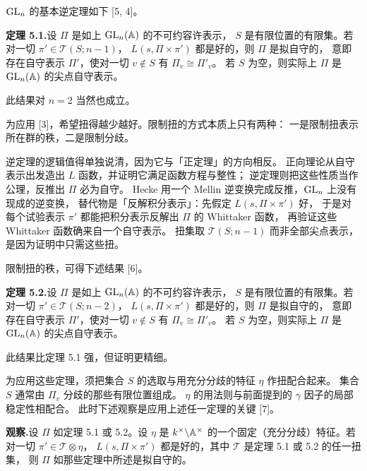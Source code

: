 $\mathrm{GL}_n$ 的基本逆定理如下 [5, 4]。

\textbf{定理 5.1.}\quad 设 $\Pi$ 是如上 $\mathrm{GL}_n(\mathbb{A})$ 的不可约容许表示，
$S$ 是有限位置的有限集。若对一切 $\pi'\in\mathcal{T}(S;n-1)$，
$L(s,\Pi\times\pi')$ 都是好的，则 $\Pi$ 是拟自守的，
意即存在自守表示 $\Pi'$，使对一切 $v\notin S$ 有 $\Pi_v\cong\Pi'_v$。
若 $S$ 为空，则实际上 $\Pi$ 是 $\mathrm{GL}_n(\mathbb{A})$ 的尖点自守表示。

此结果对 $n=2$ 当然也成立。

为应用 [3]，希望扭得越少越好。限制扭的方式本质上只有两种：
一是限制扭表示所在群的秩，二是限制分歧。
\begin{annote}
逆定理的逻辑值得单独说清，因为它与「正定理」的方向相反。
正向理论从自守表示出发造出 $L$ 函数，并证明它满足函数方程与整性；
逆定理则把这些性质当作公理，反推出 $\Pi$ 必为自守。
Hecke 用一个 Mellin 逆变换完成反推，$\mathrm{GL}_n$ 上没有现成的逆变换，
替代物是「反解积分表示」：先假定 $L(s,\Pi\times\pi')$ 好，
于是对每个试验表示 $\pi'$ 都能把积分表示反解出 $\Pi$ 的 Whittaker 函数，
再验证这些 Whittaker 函数确来自一个自守表示。
扭集取 $\mathcal{T}(S;n-1)$ 而非全部尖点表示，是因为证明中只需这些扭。
\par{}
\end{annote}

限制扭的秩，可得下述结果 [6]。

\textbf{定理 5.2.}\quad 设 $\Pi$ 是如上 $\mathrm{GL}_n(\mathbb{A})$ 的不可约容许表示，
$S$ 是有限位置的有限集。若对一切 $\pi'\in\mathcal{T}(S;n-2)$，
$L(s,\Pi\times\pi')$ 都是好的，则 $\Pi$ 是拟自守的，
意即存在自守表示 $\Pi'$，使对一切 $v\notin S$ 有 $\Pi_v\cong\Pi'_v$。
若 $S$ 为空，则实际上 $\Pi$ 是 $\mathrm{GL}_n(\mathbb{A})$ 的尖点自守表示。

此结果比定理 5.1 强，但证明更精细。

为应用这些定理，须把集合 $S$ 的选取与用充分分歧的特征 $\eta$ 作扭配合起来。
集合 $S$ 通常由 $\Pi_v$ 分歧的那些有限位置组成。
$\eta$ 的用法则与前面提到的 $\gamma$ 因子的局部稳定性相配合。
此时下述观察是应用上述任一定理的关键 [7]。

\textbf{观察.}\quad 设 $\Pi$ 如定理 5.1 或 5.2。设 $\eta$ 是 $k^\times\backslash\mathbb{A}^\times$
的一个固定（充分分歧）特征。若对一切 $\pi'\in\mathcal{T}\otimes\eta$，
$L(s,\Pi\times\pi')$ 都是好的，其中 $\mathcal{T}$ 是定理 5.1 或 5.2 的任一扭集，
则 $\Pi$ 如那些定理中所述是拟自守的。

